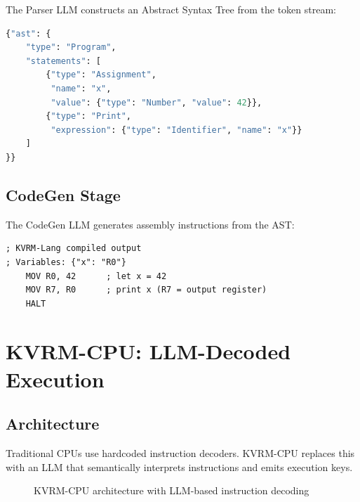 \documentclass[11pt,a4paper]{article}
\begin{document}
The Parser LLM constructs an Abstract Syntax Tree from the token stream:

\begin{lstlisting}[language=Python, caption=Parser Output (AST)]
{"ast": {
    "type": "Program",
    "statements": [
        {"type": "Assignment",
         "name": "x",
         "value": {"type": "Number", "value": 42}},
        {"type": "Print",
         "expression": {"type": "Identifier", "name": "x"}}
    ]
}}
\end{lstlisting}

\subsection{CodeGen Stage}

The CodeGen LLM generates assembly instructions from the AST:

\begin{lstlisting}[language={[x86masm]Assembler}, caption=CodeGen Output (Assembly)]
; KVRM-Lang compiled output
; Variables: {"x": "R0"}
    MOV R0, 42      ; let x = 42
    MOV R7, R0      ; print x (R7 = output register)
    HALT
\end{lstlisting}

\section{KVRM-CPU: LLM-Decoded Execution}
\label{sec:cpu}

\subsection{Architecture}

Traditional CPUs use hardcoded instruction decoders. KVRM-CPU replaces this with an LLM that semantically interprets instructions and emits execution keys.

\begin{figure}[H]
\centering
{}
\caption{KVRM-CPU architecture with LLM-based instruction decoding}
\label{fig:cpu-arch}
\end{figure}
\end{document}
